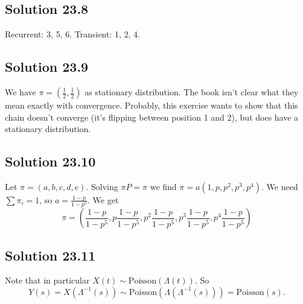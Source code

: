 \subsection*{Solution 23.8}

Recurrent: 3, 5, 6.
Transient: 1, 2, 4.


\subsection*{Solution 23.9}

We have $\pi = (\frac{1}{2}, \frac{1}{2})$ as stationary distribution.
The book isn't clear what they mean exactly with convergence.
Probably, this exercise wants to show that this chain doesn't converge (it's flipping between position 1 and 2), but does have a stationary distribution.


\subsection*{Solution 23.10}

Let $\pi = (a, b, c, d, e)$.
Solving $\pi P = \pi$ we find $\pi = a (1, p, p^2, p^3, p^4)$.
We need $\sum \pi_i = 1$, so $a = \frac{1 - p}{1 - p^5}$.
We get
\begin{equation*}
    \pi = \left(
        \frac{1 - p}{1 - p^5},
        p \frac{1 - p}{1 - p^5},
        p^2 \frac{1 - p}{1 - p^5},
        p^3 \frac{1 - p}{1 - p^5},
        p^4 \frac{1 - p}{1 - p^5}
    \right)
\end{equation*}


\subsection*{Solution 23.11}

Note that in particular $X(t) \sim \mathrm{Poisson}(\Lambda(t))$.
So
\begin{equation*}
    Y(s) = X(\Lambda^{-1}(s)) \sim \mathrm{Poisson}(\Lambda(\Lambda^{-1}(s))) = \mathrm{Poisson}(s).
\end{equation*}
